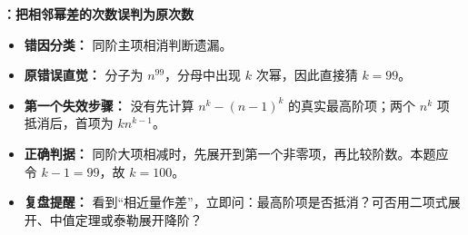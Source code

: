 
\begin{mistakeBox}
\textbf{：把相邻幂差的次数误判为原次数}

\begin{itemize}
  \item \textbf{错因分类：} 同阶主项相消判断遗漏。
  \item \textbf{原错误直觉：} 分子为 $n^{99}$，分母中出现 $k$ 次幂，因此直接猜 $k=99$。
  \item \textbf{第一个失效步骤：} 没有先计算 $n^k-(n-1)^k$ 的真实最高阶项；两个 $n^k$ 项抵消后，首项为 $k n^{k-1}$。
  \item \textbf{正确判据：} 同阶大项相减时，先展开到第一个非零项，再比较阶数。本题应令 $k-1=99$，故 $k=100$。
  \item \textbf{复盘提醒：} 看到“相近量作差”，立即问：最高阶项是否抵消？可否用二项式展开、中值定理或泰勒展开降阶？
\end{itemize}
\end{mistakeBox}

